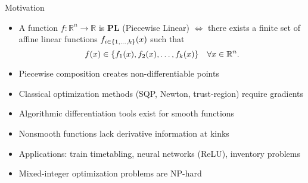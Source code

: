 \documentclass[aspectratio=169]{beamer}
\DeclarePairedDelimiter{\set}{\lbrace}{\rbrace}
\newcommand{\field}[1]{\mathbb{#1}}
\newcommand{\reals}{\field{R}}
\begin{document}
\begin{frame}{Motivation}
    \begin{itemize}[<+->]
        \item A function $f \colon \reals^n \to \reals$ is \textbf{PL}
              (Piecewise Linear) \(\iff\) there exists a finite set of affine
              linear functions $f_{i \in \set{1, \dots, k}}(x)$ such that
              \[
                  f(x) \in \set{f_1(x), f_2(x), \dots, f_k(x)}
                  \quad \forall x \in \reals^n.
              \]
        \item<2-> Piecewise composition creates non-differentiable points
        \item<3-> Classical optimization methods (SQP, Newton, trust-region)
              require gradients
        \item<4-> Algorithmic differentiation tools exist for smooth functions
        \item<5-> Nonsmooth functions lack derivative information at kinks
        \item<6-> Applications: train timetabling, neural networks (ReLU),
              inventory problems
        \item<7-> Mixed-integer optimization problems are NP-hard
    \end{itemize}


\end{frame}
\end{document}
